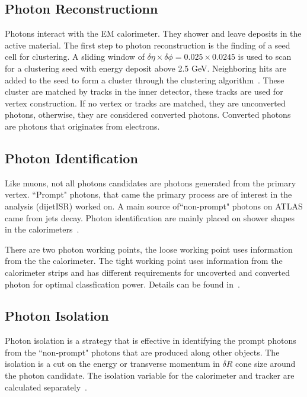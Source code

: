 \subsection{Photon Reconstructionn}
Photons interact with the EM calorimeter. They shower and leave deposits in the active material. The first step to photon reconstruction is the finding of a seed cell for clustering. A sliding window of $\delta \eta \times \delta \phi = 0.025 \times 0.0245$ is used to scan for a clustering seed with energy deposit above 2.5 GeV. Neighboring hits are added to the seed to form a cluster through the clustering algorithm~\cite{Lampl:1099735}. 
These cluster are matched by tracks in the inner detector, these tracks are used for vertex construction. If no vertex or tracks are matched, they are unconverted photons, otherwise, they are considered converted photons. Converted photons are photons that originates from electrons. 


\subsection{Photon Identification}
Like muons, not all photons candidates are photons generated from the primary vertex. ``Prompt" photons, that came the primary process are of interest in the analysis (dijetISR) worked on. A main source of``non-prompt" photons on ATLAS came from jets decay. Photon identification are mainly placed on shower shapes in the calorimeters~\cite{gammaCalibration2019}.

There are two photon working points, the loose working point uses information from the the calorimeter. The tight working point uses information from the calorimeter strips and has different requirements for uncoverted and converted photon for optimal classfication power. Details can be found in~\cite{gammaCalibration2019}. 

\subsection{Photon Isolation}
Photon isolation is a strategy that is effective in identifying the prompt photons from the ``non-prompt" photons that are produced along other objects. The isolation is a cut on the energy or transverse momentum in $\delta R $ cone size around the photon candidate. The isolation variable for the calorimeter and tracker are calculated separately~\cite{gammaCalibration2019}.

